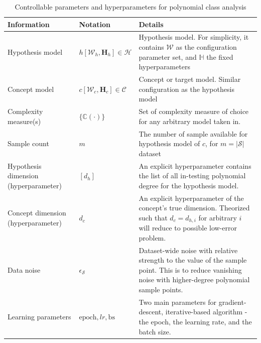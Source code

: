 \documentclass[10pt]{article} %
\begin{document}
\begin{table}[htb]
  \centering
  \footnotesize
  \begin{threeparttable}
    \caption{Controllable parameters and hyperparameters for polynomial class analysis}
    \label{tab:polynomial_test}
    \begin{tabularx}{\textwidth}{@{} L{0.25\textwidth}
                                     L{0.2\textwidth}
                                     >{\RaggedRight\arraybackslash}X @{}}
      \toprule
      \textbf{Information} & \textbf{Notation} & \textbf{Details} \\
      \midrule
      Hypothesis model
        & $h[\mathcal{W}_{h},\mathbf{H}_{h}]\in \mathcal{H}$
        & Hypothesis model. For simplicity, it contains $\mathcal{W}$ as the configuration parameter set, and $\mathbb{H}$ the fixed hyperparameters \\
      \addlinespace[1pt]
      Concept model
        & $c[\mathcal{W}_{c},\mathbf{H}_{c}]\in \mathcal{C}$
        & Concept or target model. Similar configuration as the hypothesis model \\
      \addlinespace[1pt]
      Complexity measure(s)
        & $\{\mathbb{C}(\cdot)\}$
        & Set of complexity measure of choice for any arbitrary model taken in. \\
      \addlinespace[1pt]
      Sample count
        & $m$
        & The number of sample available for hypothesis model of $c$, for $m=|\mathcal{S}|$ dataset\\
      \addlinespace[1pt]
      Hypothesis dimension (hyperparameter)
        & $[d_{h}]$
        & An explicit hyperparameter contains the list of all in-testing polynomial degree for the hypothesis model. \\
      \addlinespace[1pt]
      Concept dimension (hyperparameter)
        & $d_{c}$
        & An explicit hyperparameter of the concept's true dimension. Theorized such that $d_{c}=d_{h,i}$ for arbitrary $i$ will reduce to possible low-error problem.\\
      \addlinespace[1pt]
      Data noise
        & $\epsilon_{\mathcal{S}}$
        & Dataset-wide noise with relative strength to the value of the sample point. This is to reduce vanishing noise with higher-degree polynomial sample points. \\
      \addlinespace[1pt]
      Learning parameters
        & $\mathrm{epoch}, lr, \mathrm{bs}$
        & Two main parameters for gradient-descent, iterative-based algorithm - the epoch, the learning rate, and the batch size.\\
      \bottomrule
    \end{tabularx}


\end{threeparttable}
\end{table}
\end{document}
